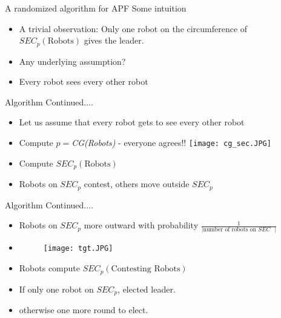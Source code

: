 \documentclass{beamer}
\begin{document}
\begin{frame}{A randomized algorithm for APF}
Some intuition
\begin{itemize}
\item A trivial observation: Only one robot on the circumference of $SEC_p(\text{Robots})$ gives the leader.
\pause
\item Any underlying assumption?
\pause
\item Every robot sees every other robot
\end{itemize}
\end{frame}

\begin{frame}{Algorithm Continued....}
\begin{itemize}
\item Let us assume that every robot gets to see every other robot
\pause
\item Compute $p=$\emph{CG(Robots)} - everyone agrees!!
\texttt{[image: cg\_sec.JPG]}
\item Compute $SEC_p(\text{Robots})$
\item Robots on $SEC_p$ contest, others move outside $SEC_p$
\end{itemize}
\end{frame}

\begin{frame}{Algorithm Continued....}
\begin{itemize}
\item Robots on $SEC_p$ more outward with probability $\frac{1}{|\text{number of robots on $SEC$ }|}$
\pause
\item \begin{figure}[ht!]
\texttt{[image: tgt.JPG]}
\end{figure}
\pause
\item Robots compute $SEC_p(\text{Contesting Robots})$
\item If only one robot on $SEC_p$, elected leader.
\item otherwise one more round to elect.
\end{itemize}
\end{frame}
\end{document}
